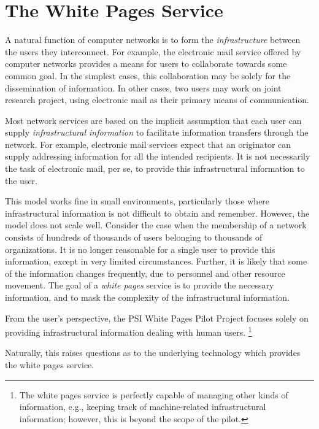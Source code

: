 
\section	{The White Pages Service}
A natural function of computer networks is to form the {\em infrastructure\/}
between the users they interconnect.
For example,
the electronic mail service offered by computer networks provides a means for
users to collaborate towards some common goal.
In the simplest cases,
this collaboration may be solely for the dissemination of information.
In other cases,
two users may work on joint research project,
using electronic mail as their primary means of communication.

Most network services are based on the implicit assumption that each user can
supply {\em infrastructural information} to 
facilitate information transfers through the network.
For example,
electronic mail services expect that an originator can supply 
addressing information 
for all the intended recipients.
It is not necessarily the task of electronic mail, per se,
to provide this infrastructural information to the user.

This model works fine in small environments,
particularly those where infrastructural information is not difficult to 
obtain and remember.
However,
the model does not scale well.
Consider the case when the membership of a network consists of hundreds of
thousands of users belonging to thousands of organizations.
It is no longer reasonable for a single user to provide this information,
except in very limited circumstances.
Further,
it is likely that some of the information changes frequently,
due to personnel and other resource movement.
The goal of a {\em white pages\/} service is to 
provide the necessary information, and to mask the complexity of the
infrastructural information.

From the user's perspective,
the PSI White Pages Pilot Project focuses solely on providing
infrastructural information dealing with human users.%
\footnote{The white pages service is perfectly capable of managing other kinds
of information,
e.g.,
keeping track of machine-related infrastructural information;
however,
this is beyond the scope of the pilot.}

Naturally,
this raises questions as to the underlying technology which provides the
white pages service.
